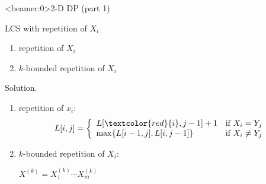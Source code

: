 \begin{frame}<beamer:0>{2-D DP (part 1)}
  \begin{exampleblock}{LCS with repetition of $X_{i}$ }
    \begin{enumerate}
      \item repetition of $X_{i}$
      \item $k$-bounded repetition of $X_{i}$
    \end{enumerate}
  \end{exampleblock}

  \begin{block}{Solution.}
    \begin{enumerate}
      \item repetition of $x_{i}$:
	\begin{displaymath}
	  L[i,j] = \left\{ \begin{array}{ll}
	    L[\textcolor{red}{i}, j-1] + 1 & \textrm{if $X_{i} = Y_{j}$}\\
	    \max \set{L[i-1,j], L[i,j-1]} & \textrm{if $X_{i} \neq Y_{j}$}
	  \end{array} \right.
	\end{displaymath}
      \item $k$-bounded repetition of $X_{i}$:

	$X^{(k)} = X_{1}^{(k)} \cdots X_{m}^{(k)}$
    \end{enumerate}
  \end{block}
\end{frame}
